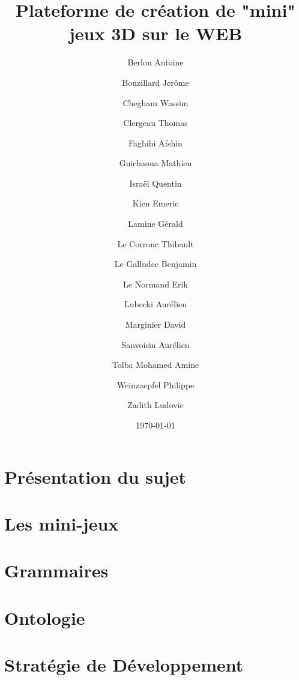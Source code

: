 \documentclass[a4paper,10pt]{article}
\title{Plateforme de création de "mini" jeux 3D sur le WEB}
\author{Berlon Antoine \and
Bouzillard Jerôme \and
Chegham Wassim \and
Clergeau Thomas \and
Faghihi Afshin \and
Guichaoua Mathieu \and
Israël Quentin \and
Kien Emeric \and
Lamine Gérald \and
Le Corronc Thibault \and
Le Galludec Benjamin \and
Le Normand Erik \and
Lubecki Aurélien \and
Marginier David \and
Sanvoisin Aurélien \and
Tolba Mohamed Amine \and
Weinzaepfel Philippe \and
Zadith Ludovic}
\date{\today}
\begin{document}
 
\maketitle

\section{Présentation du sujet}
\label{sec:sujet}
 

\section{Les mini-jeux}
\label{sec:minijeux}


\section{Grammaires}
\label{sec:grammaire}


\section{Ontologie}
\label{sec:ontologie}


\section{Stratégie de Développement}
\label{sec:strategie}


\appendix
\end{document}
